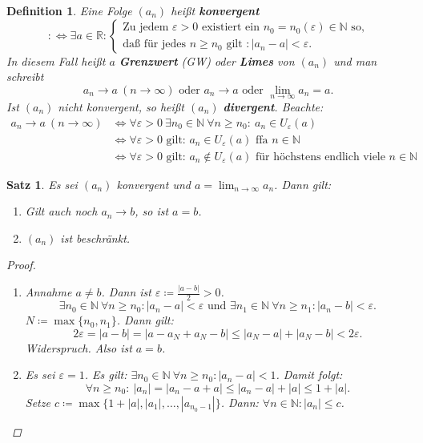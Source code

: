 \documentclass[12pt]{extreport} %
\newcommand{\N}{\mathbb{N}}
\newcommand{\R}{\mathbb{R}}
\theoremstyle{named}
\theoremstyle{itshape}
\newtheorem{satz}[unnamedtheorem]{Satz}
\newtheorem*{definition}{Definition}
\theoremstyle{normal}
\begin{document}
   
\begin{definition}
	Eine Folge $(a_{n})$ hei{\ss}t \textbf{konvergent}
	$$ :\iff \exists a \in \R : \begin{cases} \text{Zu jedem } \varepsilon > 0 \text{ existiert ein } n_{0} = n_{0}(\varepsilon) \in \N \text{ so,} \\
		\text{da{\ss} für jedes } n \geq n_{0} \text{ gilt }: |a_{n} - a| < \varepsilon.
	\end{cases} $$
	In diesem Fall hei{\ss}t $a$ \textbf{Grenzwert} (GW) oder \textbf{Limes} von $(a_{n})$ und man schreibt
	$$ 
		a_{n} \rightarrow a ~(n \rightarrow \infty) \text{ oder } a_{n} \rightarrow a \text{ oder } \lim_{n \rightarrow \infty} a_{n} = a.
	$$
	Ist $(a_{n})$ nicht konvergent, so hei{\ss}t $(a_{n})$ \textbf{divergent}. Beachte:
	\begin{align*}
		a_{n} \rightarrow a ~(n \rightarrow \infty) & \iff \forall \varepsilon > 0 ~\exists n_{0} \in \N ~\forall n \geq n_{0}: ~a_{n} \in U_{\varepsilon}(a) \\
				& \iff \forall \varepsilon > 0 \text{ gilt: } a_{n} \in U_{\varepsilon}(a) \text{ ffa } n \in \N \\
				& \iff \forall \varepsilon > 0 \text{ gilt: } a_{n} \notin U_{\varepsilon}(a) \text{ für höchstens endlich viele } n \in \N
	\end{align*}
\end{definition}


\begin{satz} \label{2.1:satz}
	Es sei $(a_{n})$ konvergent und $a = \lim_{n \rightarrow \infty} a_{n}$. Dann gilt:
	\begin{enumerate}
		\item Gilt auch noch $a_{n} \rightarrow b$, so ist $a = b$.
		\item $(a_{n})$ ist beschränkt. \label{2.1.b:satz}
	\end{enumerate}
	
	\begin{proof}\
	  \begin{enumerate}
		\item Annahme $a \neq b$. Dann ist $\varepsilon \coloneqq \frac{|a - b|}{2} > 0$.
			$$
			\exists n_{0} \in \N ~ \forall n \geq n_{0}: |a_n - a| < \varepsilon \text{ und } 
			\exists n_{1} \in \N ~ \forall n \geq n_{1}: |a_n - b| < \varepsilon. 
			$$
			$N \coloneqq \max \{ n_{0}, n_{1} \}$. Dann gilt:
			$$
				2 \varepsilon = |a - b| = | a - a_{N} + a_{N} - b| \leq |a_{N} - a| + |a_{N} - b| < 2 \varepsilon.
			$$
			Widerspruch. Also ist $ a = b$.
		\item   Es sei $\varepsilon = 1$. Es gilt: $\exists n_{0} \in \N ~\forall n \geq n_{0}: |a_{n} - a| < 1$. Damit folgt:
			$$
				\forall n \geq n_{0}: ~ |a_{n}| = |a_{n} - a + a| \leq |a_{n} - a| + |a| \leq 1 + |a|.
			$$
			Setze $c \coloneqq \max \{ 1 + |a|, |a_{1}|, \dotsc, |a_{n_{0} - 1}| \}$. Dann: $\forall n \in \N: |a_{n}| \leq c$.
	  \end{enumerate}
	\end{proof}	
\end{satz}
\end{document}

